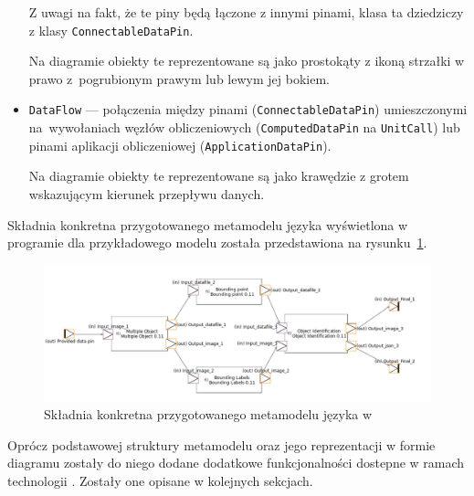 \begin{itemize}

	      Z uwagi na fakt, że te piny będą łączone z innymi pinami, klasa ta dziedziczy z klasy \texttt{ConnectableDataPin}.

	      Na diagramie obiekty te reprezentowane są jako prostokąty z ikoną strzałki w prawo z~pogrubionym prawym lub lewym jej bokiem.


	\item \texttt{DataFlow} --- połączenia między pinami
	      (\texttt{ConnectableDataPin}) umieszczonymi na~wywołaniach węzłów
	      obliczeniowych (\texttt{ComputedDataPin} na \texttt{UnitCall}) lub pinami aplikacji obliczeniowej (\texttt{ApplicationDataPin}).

	      Na diagramie obiekty te reprezentowane są jako krawędzie z grotem wskazującym kierunek przepływu danych.

\end{itemize}

Składnia konkretna przygotowanego metamodelu języka \CAL{} wyświetlona w
programie \SiriusDesktop{} dla przykładowego modelu została przedstawiona na
rysunku~\ref{rys:sirius-desktop-cal-example-model}.

\begin{figure}[!ht]
	\centering

	\includegraphics[width=0.95\linewidth]{./images/sirius-desktop-cal-example-model.png}
	\caption{Składnia konkretna przygotowanego metamodelu języka \CAL{} w
		\SiriusDesktop{}}\label{rys:sirius-desktop-cal-example-model}
\end{figure}

Oprócz podstawowej struktury metamodelu oraz jego reprezentacji w formie
diagramu zostały do niego dodane dodatkowe funkcjonalności dostepne w ramach
technologii \EMF{}. Zostały one opisane
w kolejnych sekcjach.

